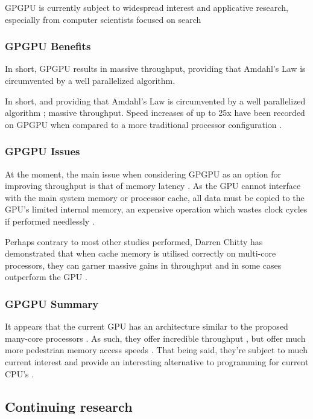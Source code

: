 \documentclass[12pt,a4paper]{article}
\begin{document}
GPGPU is currently subject to widespread interest and applicative research, especially from computer scientists focused on search \cite{gpuSoftComputing}

\subsubsection{GPGPU Benefits}

In short, GPGPU results in massive throughput, providing that Amdahl's Law \cite{amdahl} is circumvented by a well parallelized algorithm.

In short, and providing that Amdahl's Law is circumvented by a well parallelized algorithm \cite{amdahl}; massive throughput. Speed increases of up to 25x have been recorded on GPGPU when compared to a more traditional processor configuration \cite{gpuMinimisation}.  

\subsubsection{GPGPU Issues}

At the moment, the main issue when considering GPGPU as an option for improving throughput is that of memory latency \cite{gpuTutorial}. As the GPU cannot interface with the main system memory or processor cache, all data must be copied to the GPU's limited internal memory, an expensive operation which wastes clock cycles if performed needlessly \cite{gpuTutorial}.

Perhaps contrary to most other studies performed, Darren Chitty has demonstrated that when cache memory is utilised correctly on multi-core processors, they can garner massive gains in throughput and in some cases outperform the GPU \cite{gpuVsCPU}.

\subsubsection{GPGPU Summary}

It appears that the current GPU has an architecture similar to the proposed many-core processors \cite{thousandCoreChips,gpuTutorial}. As such, they offer incredible throughput \cite{gpuMinimisation}, but offer much more pedestrian memory access speeds \cite{gpuVsCPU}. That being said, they're subject to much current interest and provide an interesting alternative to programming for current CPU's \cite{gpuSoftComputing}.

\subsection{Continuing research}
\end{document}
